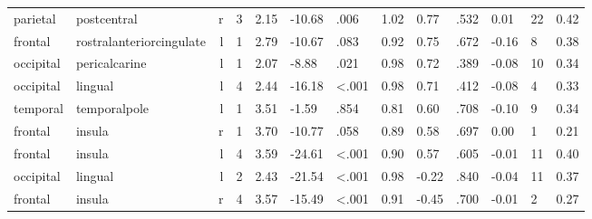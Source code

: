 \documentclass{article}
\begin{document}
\begin{longtable}{llrR{1.3cm}R{1cm}R{1.3cm}R{1cm}R{1cm}R{1.3cm}R{1cm}R{1.8cm}R{1.3cm}R{1.8cm}}
  parietal &               postcentral &    r &         3 &                  2.15 &           -10.68 &               .006 &                               1.02 &                          0.77 &                            .532 &   0.01 &     22 &      0.42 \\
   frontal &  rostralanteriorcingulate &    l &         1 &                  2.79 &           -10.67 &               .083 &                               0.92 &                          0.75 &                            .672 &  -0.16 &      8 &      0.38 \\
 occipital &             pericalcarine &    l &         1 &                  2.07 &            -8.88 &               .021 &                               0.98 &                          0.72 &                            .389 &  -0.08 &     10 &      0.34 \\
 occipital &                   lingual &    l &         4 &                  2.44 &           -16.18 &      \textless.001 &                               0.98 &                          0.71 &                            .412 &  -0.08 &      4 &      0.33 \\
  temporal &              temporalpole &    l &         1 &                  3.51 &            -1.59 &               .854 &                               0.81 &                          0.60 &                            .708 &  -0.10 &      9 &      0.34 \\
   frontal &                    insula &    r &         1 &                  3.70 &           -10.77 &               .058 &                               0.89 &                          0.58 &                            .697 &   0.00 &      1 &      0.21 \\
   frontal &                    insula &    l &         4 &                  3.59 &           -24.61 &      \textless.001 &                               0.90 &                          0.57 &                            .605 &  -0.01 &     11 &      0.40 \\
 occipital &                   lingual &    l &         2 &                  2.43 &           -21.54 &      \textless.001 &                               0.98 &                         -0.22 &                            .840 &  -0.04 &     11 &      0.37 \\
   frontal &                    insula &    r &         4 &                  3.57 &           -15.49 &      \textless.001 &                               0.91 &                         -0.45 &                            .700 &  -0.01 &      2 &      0.27 \\

\end{longtable}
\end{document}

